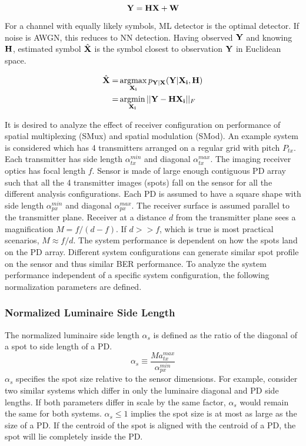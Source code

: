 \begin{equation}
	\label{eqMimoChannel2}
	\bf{Y} = \bf{H}\bf{X} + \bf{W}
\end{equation}

For a channel with equally likely symbols, ML detector is the optimal detector. If noise is AWGN, this reduces to NN detection. Having observed ${\bf{Y}}$ and knowing ${\bf{H}}$, estimated symbol $\hat{{\bf{X}}}$ is the symbol closest to observation ${\bf{Y}}$ in Euclidean space.

\begin{gather}
\begin{aligned}
	\hat{{\bf{X}}} =&{} \argmax_{{\bf{X_i}}} p_{{\bf{Y}}|{\bf{X}}}({\bf{Y}}|{\bf{X_i}},{\bf{H}})\\
	=&{} \argmin_{{\bf{X_i}}} ||{\bf{Y}}-{\bf{H}}{\bf{X_i}}||_{F}
\label{eq:ML2}
\end{aligned}
\end{gather}

It is desired to analyze the effect of receiver configuration on performance of spatial multiplexing (SMux) and spatial modulation (SMod). An example system is considered which has 4 transmitters arranged on a regular grid with pitch $P_{tx}$. Each transmitter has side length $\alpha_{tx}^{min}$ and diagonal $\alpha_{tx}^{max}$. The imaging receiver optics has focal length $f$. Sensor is made of large enough contiguous PD array such that all the 4 transmitter images (spots) fall on the sensor for all the different analysis configurations. Each PD is assumed to have a square shape with side length $\alpha_{px}^{min}$ and diagonal $\alpha_{px}^{max}$. The receiver surface is assumed parallel to the transmitter plane. Receiver at a distance $d$ from the transmitter plane sees a magnification $M=f/(d-f)$. If $d>>f$, which is true is most practical scenarios, $M\approx f/d$. The system performance is dependent on how the spots land on the PD array. Different system configurations can generate similar spot profile on the sensor and thus similar BER performance.  To analyze the system performance independent of a specific system configuration, the following normalization parameters are defined.

\subsubsection{Normalized Luminaire Side Length}
\label{subsubsec:osmImagingSide}
The normalized luminaire side length $\alpha_{s}$ is defined as the ratio of the diagonal of a spot to side length of a PD. 
\begin{equation}
	\label{eqAlphaS}
	\alpha_{s} \equiv \frac{M a_{tx}^{max}}{\alpha_{px}^{min}}
\end{equation}
$\alpha_{s}$ specifies the spot size relative to the sensor dimensions. For example, consider two similar systems which differ in only the luminaire diagonal and PD side lengths. If both parameters differ in scale by the same factor, $\alpha_{s}$ would remain the same for both systems. $\alpha_{s}\leq 1$ implies the spot size is at most as large as the size of a PD. If the centroid of the spot is aligned with the centroid of a PD, the spot will lie completely inside the PD.
 
